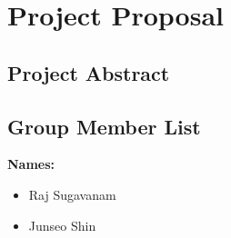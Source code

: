 \documentclass[12pt]{article}
\begin{document}
{\section*{Project Proposal}}

{\subsection*{Project Abstract}}


{\subsection*{Group Member List}}

\textbf{Names:}
\begin{itemize}
    \item Raj Sugavanam
    \item Junseo Shin
\end{itemize}
\end{document}
